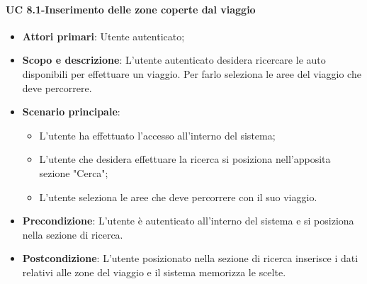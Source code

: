       \paragraph{UC 8.1-Inserimento delle zone coperte dal viaggio }
       \begin{itemize}
        \item \textbf{Attori primari}: Utente autenticato;
        
        \item \textbf{Scopo e descrizione}: L'utente autenticato desidera ricercare le auto disponibili per effettuare un viaggio. Per farlo seleziona le aree del viaggio che deve percorrere.
        \item \textbf{Scenario principale}:
            \begin{itemize}
                \item L'utente ha effettuato l'accesso all'interno del sistema;
                \item L'utente che desidera effettuare la ricerca si posiziona nell'apposita sezione "Cerca";
                \item L'utente seleziona le aree che deve percorrere con il suo viaggio.
            \end{itemize}
        
        \item \textbf{Precondizione}: L'utente è autenticato all'interno del sistema e si posiziona nella sezione di ricerca.
        \item \textbf{Postcondizione}: L'utente posizionato nella sezione di ricerca inserisce i dati relativi alle zone del viaggio e il sistema memorizza le scelte.
        \end{itemize}
        
        
        
        
